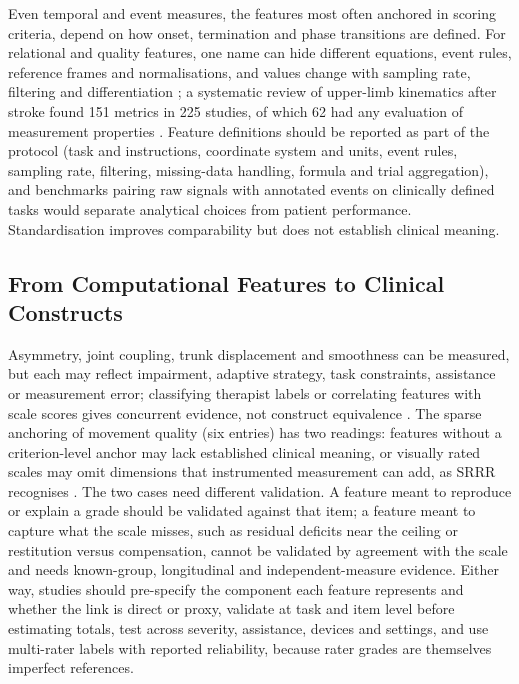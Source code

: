 \documentclass[11pt]{article}
\begin{document}
Even temporal and event measures, the features most often anchored in scoring criteria, depend on how onset, termination and phase transitions are defined. For relational and quality features, one name can hide different equations, event rules, reference frames and normalisations, and values change with sampling rate, filtering and differentiation \cite{Jung2017MovementQuality,Proffitt2023DepthMovement,Yang2013SpatiotemporalGait,S3Stenum202438530801}; a systematic review of upper-limb kinematics after stroke found 151 metrics in 225 studies, of which 62 had any evaluation of measurement properties \cite{Schwarz2019UpperLimbKinematicsSR}. Feature definitions should be reported as part of the protocol (task and instructions, coordinate system and units, event rules, sampling rate, filtering, missing-data handling, formula and trial aggregation), and benchmarks pairing raw signals with annotated events on clinically defined tasks would separate analytical choices from patient performance. Standardisation improves comparability but does not establish clinical meaning.

\subsection{From Computational Features to Clinical Constructs}
\label{sec:constructs}

Asymmetry, joint coupling, trunk displacement and smoothness can be measured, but each may reflect impairment, adaptive strategy, task constraints, assistance or measurement error; classifying therapist labels or correlating features with scale scores gives concurrent evidence, not construct equivalence \cite{Zhi2018CompensationDetection,Lee2021SmartphoneVideoAmbulation,Li2017IMUEMGMotorEvaluation,Grimm2021KinematicValidation}. The sparse anchoring of movement quality (six entries) has two readings: features without a criterion-level anchor may lack established clinical meaning, or visually rated scales may omit dimensions that instrumented measurement can add, as SRRR recognises \cite{CoreKwakkel2019SRRRUpperLimb}. The two cases need different validation. A feature meant to reproduce or explain a grade should be validated against that item; a feature meant to capture what the scale misses, such as residual deficits near the ceiling or restitution versus compensation, cannot be validated by agreement with the scale and needs known-group, longitudinal and independent-measure evidence. Either way, studies should pre-specify the component each feature represents and whether the link is direct or proxy, validate at task and item level before estimating totals, test across severity, assistance, devices and settings, and use multi-rater labels with reported reliability, because rater grades are themselves imperfect references.
\end{document}
